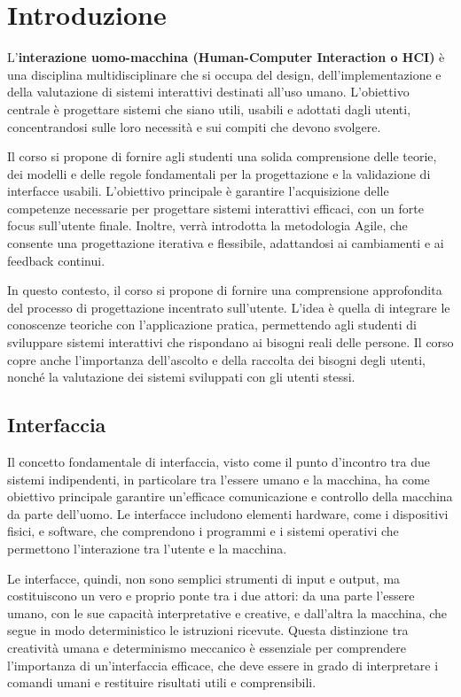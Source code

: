 \chapter{Introduzione}

\begin{redbar}
L’\textbf{interazione uomo-macchina (Human-Computer Interaction o HCI)} è una disciplina multidisciplinare che si occupa del design, dell'implementazione e della valutazione di sistemi interattivi destinati all’uso umano. L'obiettivo centrale è progettare sistemi che siano utili, usabili e adottati dagli utenti, concentrandosi sulle loro necessità e sui compiti che devono svolgere.
\end{redbar}

Il corso si propone di fornire agli studenti una solida comprensione delle teorie, dei modelli e delle regole fondamentali per la progettazione e la validazione di interfacce usabili. L'obiettivo principale è garantire l'acquisizione delle competenze necessarie per progettare sistemi interattivi efficaci, con un forte focus sull'utente finale. Inoltre, verrà introdotta la metodologia Agile, che consente una progettazione iterativa e flessibile, adattandosi ai cambiamenti e ai feedback continui.

In questo contesto, il corso si propone di fornire una comprensione approfondita del processo di progettazione incentrato sull'utente. L’idea è quella di integrare le conoscenze teoriche con l’applicazione pratica, permettendo agli studenti di sviluppare sistemi interattivi che rispondano ai bisogni reali delle persone. Il corso copre anche l’importanza dell’ascolto e della raccolta dei bisogni degli utenti, nonché la valutazione dei sistemi sviluppati con gli utenti stessi.

\section{Interfaccia}
Il concetto fondamentale di interfaccia, visto come il punto d'incontro tra due sistemi indipendenti, in particolare tra l'essere umano e la macchina, ha come obiettivo principale garantire un’efficace comunicazione e controllo della macchina da parte dell’uomo. Le interfacce includono elementi hardware, come i dispositivi fisici, e software, che comprendono i programmi e i sistemi operativi che permettono l'interazione tra l’utente e la macchina.

Le interfacce, quindi, non sono semplici strumenti di input e output, ma costituiscono un vero e proprio ponte tra i due attori: da una parte l’essere umano, con le sue capacità interpretative e creative, e dall'altra la macchina, che segue in modo deterministico le istruzioni ricevute. Questa distinzione tra creatività umana e determinismo meccanico è essenziale per comprendere l'importanza di un’interfaccia efficace, che deve essere in grado di interpretare i comandi umani e restituire risultati utili e comprensibili.

